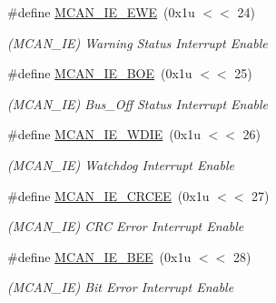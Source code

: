 \begin{DoxyCompactItemize}
\mbox{\label{group__SAMV71__MCAN_gaac4c84e4ac5afca631fa0cba59a8b751}} 
\#define \mbox{\hyperlink{group__SAMV71__MCAN_gaac4c84e4ac5afca631fa0cba59a8b751}{M\+C\+A\+N\+\_\+\+I\+E\+\_\+\+E\+WE}}~(0x1u $<$$<$ 24)
\begin{DoxyCompactList}\small\item\em (M\+C\+A\+N\+\_\+\+IE) Warning Status Interrupt Enable \end{DoxyCompactList}\item 
\mbox{\label{group__SAMV71__MCAN_ga1bd88452eeeec0756c853de694f1cf48}} 
\#define \mbox{\hyperlink{group__SAMV71__MCAN_ga1bd88452eeeec0756c853de694f1cf48}{M\+C\+A\+N\+\_\+\+I\+E\+\_\+\+B\+OE}}~(0x1u $<$$<$ 25)
\begin{DoxyCompactList}\small\item\em (M\+C\+A\+N\+\_\+\+IE) Bus\+\_\+\+Off Status Interrupt Enable \end{DoxyCompactList}\item 
\mbox{\label{group__SAMV71__MCAN_gae27466326bb66d9071c0bedc7254cb21}} 
\#define \mbox{\hyperlink{group__SAMV71__MCAN_gae27466326bb66d9071c0bedc7254cb21}{M\+C\+A\+N\+\_\+\+I\+E\+\_\+\+W\+D\+IE}}~(0x1u $<$$<$ 26)
\begin{DoxyCompactList}\small\item\em (M\+C\+A\+N\+\_\+\+IE) Watchdog Interrupt Enable \end{DoxyCompactList}\item 
\mbox{\label{group__SAMV71__MCAN_ga808bdd43fac86550b4389ad0cd5f3cf4}} 
\#define \mbox{\hyperlink{group__SAMV71__MCAN_ga808bdd43fac86550b4389ad0cd5f3cf4}{M\+C\+A\+N\+\_\+\+I\+E\+\_\+\+C\+R\+C\+EE}}~(0x1u $<$$<$ 27)
\begin{DoxyCompactList}\small\item\em (M\+C\+A\+N\+\_\+\+IE) C\+RC Error Interrupt Enable \end{DoxyCompactList}\item 
\mbox{\label{group__SAMV71__MCAN_gaa131fdd4cadf2cd6134ca458ac309bd9}} 
\#define \mbox{\hyperlink{group__SAMV71__MCAN_gaa131fdd4cadf2cd6134ca458ac309bd9}{M\+C\+A\+N\+\_\+\+I\+E\+\_\+\+B\+EE}}~(0x1u $<$$<$ 28)
\begin{DoxyCompactList}\small\item\em (M\+C\+A\+N\+\_\+\+IE) Bit Error Interrupt Enable \end{DoxyCompactList}\item 
$$
\end{DoxyCompactItemize}
